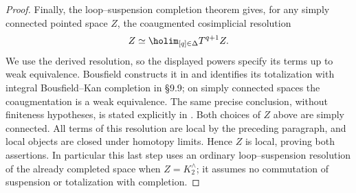 \begin{proof}
Finally, the loop--suspension completion theorem gives, for any simply connected pointed space $Z$, the coaugmented cosimplicial resolution
\[
 Z\simeq\holim_{[q]\in\Delta} T^{q+1}Z.
\]
We use the derived resolution, so the displayed powers specify its terms up to weak equivalence. Bousfield constructs it in \cite[\S7.9]{FGHBousfield2003} and identifies its totalization with integral Bousfield--Kan completion in \S9.9; on simply connected spaces the coaugmentation is a weak equivalence. The same precise conclusion, without finiteness hypotheses, is stated explicitly in \cite[Theorem 1.8(b)]{FGHBlomquistHarper2017}. Both choices of $Z$ above are simply connected. All terms of this resolution are local by the preceding paragraph, and local objects are closed under homotopy limits. Hence $Z$ is local, proving both assertions. In particular this last step uses an ordinary loop--suspension resolution of the already completed space when $Z=K^{\wedge}_2$; it assumes no commutation of suspension or totalization with completion.
\end{proof}

